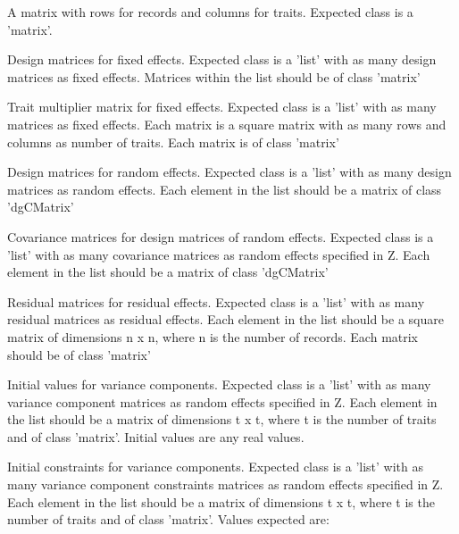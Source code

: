 \documentclass[a4paper]{book}
\begin{document}
%
\begin{Arguments}
\begin{ldescription}
\item[\code{Y}] 
A matrix with rows for records and columns for traits. Expected class is a 'matrix'.

\item[\code{X}] 
Design matrices for fixed effects. Expected class is a 'list' with as many design 
matrices as fixed effects. Matrices within the list should be of class 'matrix'

\item[\code{Gx}] 
Trait multiplier matrix for fixed effects. Expected class is a 'list' with as many matrices as 
fixed effects. Each matrix is a square matrix with as many rows and columns as
number of traits. Each matrix is of class 'matrix'

\item[\code{Z}] 
Design matrices for random effects. Expected class is a 'list' with as many design 
matrices as random effects. Each element in the list should be a matrix of class
'dgCMatrix'

\item[\code{K}] 
Covariance matrices for design matrices of random effects. Expected class is a 'list' with as many  
covariance matrices as random effects specified in Z. Each element in the list should be a matrix of class
'dgCMatrix'

\item[\code{R}] 
Residual matrices for residual effects. Expected class is a 'list' with as many  
residual matrices as residual effects. Each element in the list should be a square 
matrix of dimensions n x n, where n is the number of records. Each matrix should be of class
'matrix'

\item[\code{Ge}] 
Initial values for variance components. Expected class is a 'list' with as many  
variance component matrices as random effects specified in Z. Each element in the 
list should be a matrix of dimensions t x t, where t is the number of traits and of 
class 'matrix'. Initial values are any real values.

\item[\code{GeI}] 
Initial constraints for variance components. Expected class is a 'list' with as many  
variance component constraints matrices as random effects specified in Z. Each element in the 
list should be a matrix of dimensions t x t, where t is the number of traits and of 
class 'matrix'. Values expected are:


\end{ldescription}
\end{Arguments}
\end{document}
